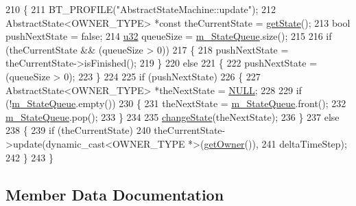 \begin{DoxyCode}
210   \{
211     BT\_PROFILE(\textcolor{stringliteral}{"AbstractStateMachine::update"});
212     AbstractState<OWNER\_TYPE> *\textcolor{keyword}{const} theCurrentState = \mbox{\hyperlink{classnjli_1_1_abstract_state_machine_a026a33bc918f423304b442e0dfaa046e}{getState}}();
213     \textcolor{keywordtype}{bool} pushNextState = \textcolor{keyword}{false};
214     \mbox{\hyperlink{_util_8h_a10e94b422ef0c20dcdec20d31a1f5049}{u32}} queueSize = \mbox{\hyperlink{classnjli_1_1_abstract_state_machine_afc1c0619e024e807c01802979d5ef3db}{m\_StateQueue}}.size();
215 
216     \textcolor{keywordflow}{if} (theCurrentState && (queueSize > 0))
217       \{
218         pushNextState = theCurrentState->isFinished();
219       \}
220     \textcolor{keywordflow}{else}
221       \{
222         pushNextState = (queueSize > 0);
223       \}
224 
225     \textcolor{keywordflow}{if} (pushNextState)
226       \{
227         AbstractState<OWNER\_TYPE> *theNextState = \mbox{\hyperlink{_abstract_state_8h_a070d2ce7b6bb7e5c05602aa8c308d0c4}{NULL}};
228 
229         \textcolor{keywordflow}{if} (!\mbox{\hyperlink{classnjli_1_1_abstract_state_machine_afc1c0619e024e807c01802979d5ef3db}{m\_StateQueue}}.empty())
230           \{
231             theNextState = \mbox{\hyperlink{classnjli_1_1_abstract_state_machine_afc1c0619e024e807c01802979d5ef3db}{m\_StateQueue}}.front();
232             \mbox{\hyperlink{classnjli_1_1_abstract_state_machine_afc1c0619e024e807c01802979d5ef3db}{m\_StateQueue}}.pop();
233           \}
234 
235         \mbox{\hyperlink{classnjli_1_1_abstract_state_machine_a5133f8815d99e63c09179928e2c736b6}{changeState}}(theNextState);
236       \}
237     \textcolor{keywordflow}{else}
238       \{
239         \textcolor{keywordflow}{if} (theCurrentState)
240           theCurrentState->update(dynamic\_cast<OWNER\_TYPE *>(\mbox{\hyperlink{classnjli_1_1_abstract_state_machine_aabf808253d72265695e03c299a434798}{getOwner}}()),
241                                   deltaTimeStep);
242       \}
243   \}
\end{DoxyCode}


\subsection{Member Data Documentation}
\mbox{\label{classnjli_1_1_abstract_state_machine_ae82332bd955b01fa48471ec0613e8207}} 
